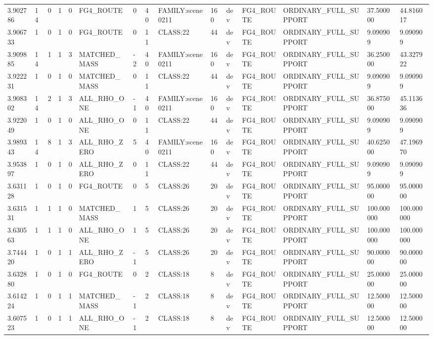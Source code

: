 \begin{tabular}{lllllllllllllll}
3.902786 & 14 & 0 & 1 & 0 & FG4\_ROUTE & 0 & 40 & FAMILY:scene0211 & 160 & dev & FG4\_ROUTE & ORDINARY\_FULL\_SUPPORT & 37.500000 & 44.816017 \\
3.906733 & 1 & 0 & 1 & 0 & FG4\_ROUTE & 0 & 11 & CLASS:22 & 44 & dev & FG4\_ROUTE & ORDINARY\_FULL\_SUPPORT & 9.090909 & 9.090909 \\
3.909885 & 14 & 1 & 1 & 3 & MATCHED\_MASS & -2 & 40 & FAMILY:scene0211 & 160 & dev & FG4\_ROUTE & ORDINARY\_FULL\_SUPPORT & 36.250000 & 43.327922 \\
3.922231 & 1 & 0 & 1 & 0 & MATCHED\_MASS & 0 & 11 & CLASS:22 & 44 & dev & FG4\_ROUTE & ORDINARY\_FULL\_SUPPORT & 9.090909 & 9.090909 \\
3.908302 & 14 & 2 & 1 & 3 & ALL\_RHO\_ONE & -1 & 40 & FAMILY:scene0211 & 160 & dev & FG4\_ROUTE & ORDINARY\_FULL\_SUPPORT & 36.875000 & 45.113636 \\
3.922049 & 1 & 0 & 1 & 0 & ALL\_RHO\_ONE & 0 & 11 & CLASS:22 & 44 & dev & FG4\_ROUTE & ORDINARY\_FULL\_SUPPORT & 9.090909 & 9.090909 \\
3.989343 & 14 & 8 & 1 & 3 & ALL\_RHO\_ZERO & 5 & 40 & FAMILY:scene0211 & 160 & dev & FG4\_ROUTE & ORDINARY\_FULL\_SUPPORT & 40.625000 & 47.196970 \\
3.953897 & 1 & 0 & 1 & 0 & ALL\_RHO\_ZERO & 0 & 11 & CLASS:22 & 44 & dev & FG4\_ROUTE & ORDINARY\_FULL\_SUPPORT & 9.090909 & 9.090909 \\
3.631128 & 1 & 0 & 1 & 0 & FG4\_ROUTE & 0 & 5 & CLASS:26 & 20 & dev & FG4\_ROUTE & ORDINARY\_FULL\_SUPPORT & 95.000000 & 95.000000 \\
3.631531 & 1 & 1 & 1 & 0 & MATCHED\_MASS & 1 & 5 & CLASS:26 & 20 & dev & FG4\_ROUTE & ORDINARY\_FULL\_SUPPORT & 100.000000 & 100.000000 \\
3.630563 & 1 & 1 & 1 & 0 & ALL\_RHO\_ONE & 1 & 5 & CLASS:26 & 20 & dev & FG4\_ROUTE & ORDINARY\_FULL\_SUPPORT & 100.000000 & 100.000000 \\
3.744420 & 1 & 0 & 1 & 1 & ALL\_RHO\_ZERO & -1 & 5 & CLASS:26 & 20 & dev & FG4\_ROUTE & ORDINARY\_FULL\_SUPPORT & 90.000000 & 90.000000 \\
3.632880 & 1 & 0 & 1 & 0 & FG4\_ROUTE & 0 & 2 & CLASS:18 & 8 & dev & FG4\_ROUTE & ORDINARY\_FULL\_SUPPORT & 25.000000 & 25.000000 \\
3.614224 & 1 & 0 & 1 & 1 & MATCHED\_MASS & -1 & 2 & CLASS:18 & 8 & dev & FG4\_ROUTE & ORDINARY\_FULL\_SUPPORT & 12.500000 & 12.500000 \\
3.607523 & 1 & 0 & 1 & 1 & ALL\_RHO\_ONE & -1 & 2 & CLASS:18 & 8 & dev & FG4\_ROUTE & ORDINARY\_FULL\_SUPPORT & 12.500000 & 12.500000 \\

\end{tabular}
